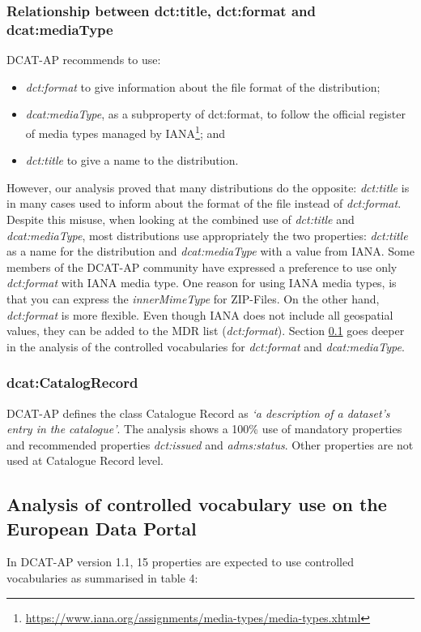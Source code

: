 \documentclass[<options>]{elsarticle}
\begin{document}
\subsubsection{Relationship between dct:title, dct:format and dcat:mediaType}
DCAT-AP recommends to use:
\begin{itemize}
\item \textit{dct:format} to give information about the file format of the distribution;
\item \textit{dcat:mediaType}, as a subproperty of dct:format, to follow the official register of media types managed by IANA\footnote{\href{ https://www.iana.org/assignments/media-types/media-types.xhtml}{   https://www.iana.org/assignments/media-types/media-types.xhtml}}; and
\item \textit{dct:title} to give a name to the distribution.
\end{itemize}

However, our analysis proved that many distributions do the opposite: \textit{dct:title} is in many cases used to inform about the format of the file instead of \textit{dct:format}. Despite this misuse, when looking at the combined use of \textit{dct:title} and \textit{dcat:mediaType}, most distributions use appropriately the two properties: \textit{dct:title} as a name for the distribution and \textit{dcat:mediaType} with a value from IANA. Some members of the DCAT-AP community have expressed a preference to use only \textit{dct:format} with IANA media type. One reason for using IANA media types, is that you can express the \textit{innerMimeType} for ZIP-Files. On the other hand, \textit{dct:format} is more flexible. Even though IANA does not include all geospatial values, they can be added to the MDR list (\textit{dct:format}). Section \ref{VocabularyAnalysis} goes deeper in the analysis of the controlled vocabularies for \textit{dct:format} and \textit{dcat:mediaType}. 

\subsubsection{dcat:CatalogRecord}
DCAT-AP defines the class Catalogue Record as \textit{‘a description of a dataset’s entry in the catalogue’}. The analysis shows a 100\% use of mandatory properties and recommended properties \textit{dct:issued} and \textit{adms:status}. Other properties are not used at Catalogue Record level.

\subsection{Analysis of controlled vocabulary use on the European Data Portal} \label{VocabularyAnalysis}
In DCAT-AP version 1.1, 15 properties are expected to use controlled vocabularies as summarised in table 4: 
\end{document}
